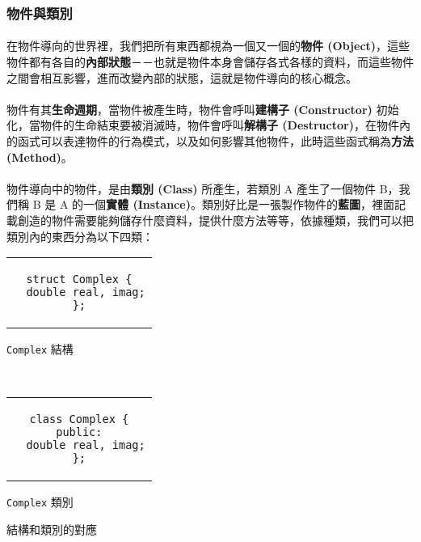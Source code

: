\documentclass[12pt,a4paper,oneside]{report}
\begin{document}
\begin{CJK}{UTF8}{bkai}
\subsubsection{物件與類別}

\paragraph{}在物件導向的世界裡，我們把所有東西都視為一個又一個的\textbf{物件 (Object)}，這些物件都有各自的\textbf{內部狀態}－－也就是物件本身會儲存各式各樣的資料，而這些物件之間會相互影響，進而改變內部的狀態，這就是物件導向的核心概念。
\paragraph{}物件有其\textbf{生命週期}，當物件被產生時，物件會呼叫\textbf{建構子 (Constructor)} 初始化，當物件的生命結束要被消滅時，物件會呼叫\textbf{解構子 (Destructor)}，在物件內的函式可以表達物件的行為模式，以及如何影響其他物件，此時這些函式稱為\textbf{方法 (Method)}。
\paragraph{}物件導向中的物件，是由\textbf{類別 (Class)} 所產生，若類別 A 產生了一個物件 B，我們稱 B 是 A 的一個\textbf{實體 (Instance)}。類別好比是一張製作物件的{\color{red}\textbf{藍圖}}，裡面記載創造的物件需要能夠儲存什麼資料，提供什麼方法等等，依據種類，我們可以把類別內的東西分為以下四類：

\begin{code}[h!]
\centering
\begin{subcode}{.4\textwidth}
  \centering
  \begin{tabular}{c}
  \begin{lstlisting}
struct Complex {
  double real, imag;
};
  \end{lstlisting}
  \end{tabular}
  \caption{\texttt{Complex} 結構}
  \label{program:struct:code:class:1}
\end{subcode}
~
\begin{subcode}{.4\textwidth}
  \centering
  \begin{tabular}{c}
  \begin{lstlisting}
class Complex {
public:
  double real, imag;
};
  \end{lstlisting}
  \end{tabular}
  \caption{\texttt{Complex} 類別}
  \label{program:struct:code:class:2}
\end{subcode}
\caption{結構和類別的對應}
\label{program:struct:code:class}
\end{code}


\end{CJK}
\end{document}
